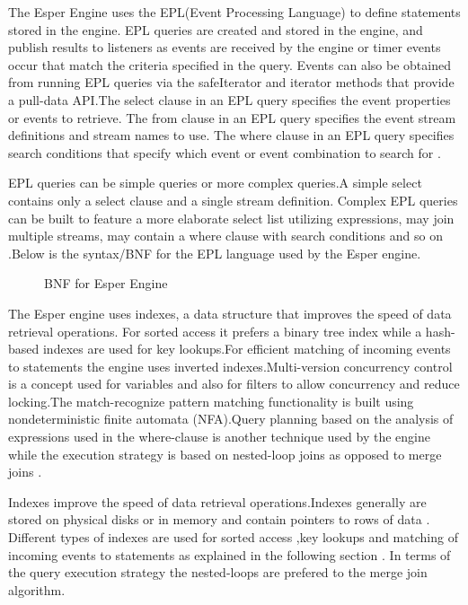 \noindent The Esper Engine uses the EPL(Event Processing Language) to define statements stored in the engine. EPL queries are created and stored in the engine, and publish results to listeners as events are received by the engine or timer events occur that match the criteria specified in the query. Events can also be obtained from running EPL queries via the safeIterator and iterator methods that provide a pull-data API.The select clause in an EPL query specifies the event properties or events to retrieve. The from clause in an EPL query specifies the event stream  definitions and stream names to use. The where clause in an EPL query specifies search conditions that specify which event or event combination to search for \cite{twentyfive}.

\noindent EPL queries can be simple queries or more complex queries.A simple select contains only a select  clause and a single stream definition. Complex EPL queries can be built to feature a more elaborate select list utilizing expressions, may join multiple streams, may contain a where clause with search conditions and so on \cite{twentyfive}.Below is the syntax/BNF for the EPL language used by the Esper engine.

\begin{center}
\begin{figure}[h]
\caption{BNF for Esper Engine \cite{twentyfive}}

\end{figure}
\end{center}

\noindent The Esper engine \cite{twentyfive} uses indexes, a data structure that improves the speed of data retrieval operations. For sorted access it prefers a binary tree index while a hash-based indexes are used for key lookups.For efficient matching of incoming events to statements the engine uses inverted indexes.Multi-version concurrency control is a concept used for variables and also for filters to allow concurrency and reduce locking.The match-recognize pattern matching functionality is built using nondeterministic finite automata (NFA).Query planning based on the analysis of expressions used in the where-clause is another technique used by the engine while the execution strategy is based on nested-loop joins as opposed to merge joins \cite{twentyfive}.

\noindent Indexes improve the speed of data retrieval operations.Indexes generally are stored on physical disks or in memory and contain pointers to rows of data \cite{twentyfive}. Different types of indexes are used for sorted access ,key lookups  and matching of incoming events to statements as explained in the following section . In terms of the query execution strategy the nested-loops are prefered to the merge join algorithm.

